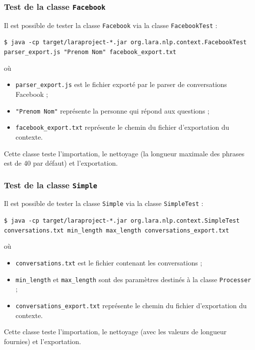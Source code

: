 \documentclass[10pt,a4paper]{article}
\begin{document}
\subsubsection{Test de la classe \texttt{Facebook}}
Il est possible de tester la classe \texttt{Facebook} via la classe \texttt{FacebookTest} :
\begin{center}
	\texttt{\$ java -cp target/laraproject-*.jar org.lara.nlp.context.FacebookTest parser\_export.js "Prenom Nom" facebook\_export.txt}
\end{center}
où
\begin{itemize}
	\item \texttt{parser\_export.js} est le fichier exporté par le parser de conversations Facebook ;
	\item \texttt{"Prenom Nom"} représente la personne qui répond aux questions ;
	\item \texttt{facebook\_export.txt} représente le chemin du fichier d'exportation du contexte.
\end{itemize}
Cette classe teste l'importation, le nettoyage (la longueur maximale des phrases est de 40 par défaut) et l'exportation.
\subsubsection{Test de la classe \texttt{Simple}}
Il est possible de tester la classe \texttt{Simple} via la classe \texttt{SimpleTest} :
\begin{center}
	\texttt{\$ java -cp target/laraproject-*.jar org.lara.nlp.context.SimpleTest conversations.txt min\_length max\_length conversations\_export.txt}
\end{center}
où
\begin{itemize}
	\item \texttt{conversations.txt} est le fichier contenant les conversations ;
	\item \texttt{min\_length} et \texttt{max\_length} sont des paramètres destinés à la classe \texttt{Processer} ;
	\item \texttt{conversations\_export.txt} représente le chemin du fichier d'exportation du contexte.
\end{itemize}
Cette classe teste l'importation, le nettoyage (avec les valeurs de longueur fournies) et l'exportation.
\end{document}
